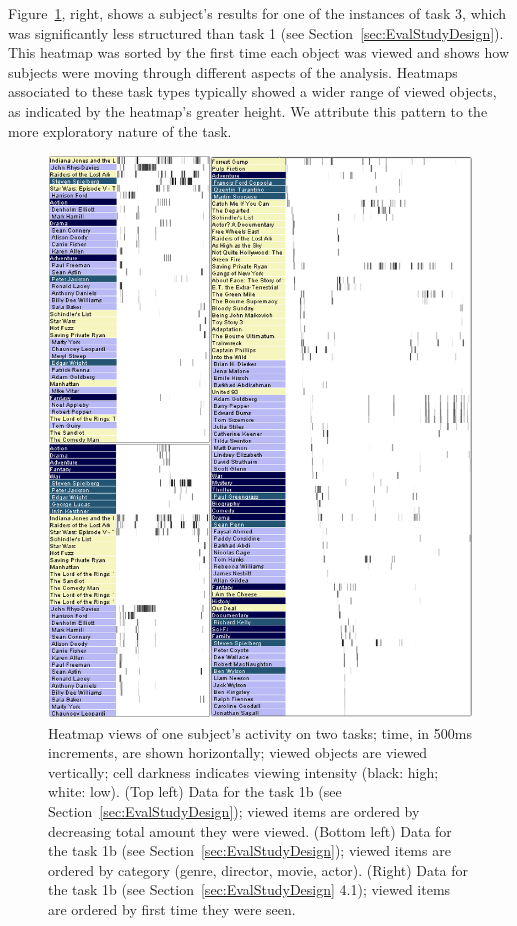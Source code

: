 Figure~\ref{fig:heatmap}, right, shows a subject's results for one of the instances of task 3, which was significantly less structured than task 1 (see Section~\ref{sec:EvalStudyDesign}). This heatmap  was sorted by the first time each object was viewed and shows how subjects were moving through different aspects of the analysis. Heatmaps associated to these task types typically showed a wider range of viewed objects, as indicated by the heatmap's greater height. We attribute this pattern to the more exploratory nature of the task.  

\begin{figure}[!ht]
  \centering
  \includegraphics[width=0.9\linewidth]{images/heatmaps.eps}
  \caption{Heatmap views of one subject's activity on two tasks; time, in 500ms increments, are shown horizontally; viewed objects are viewed vertically; cell darkness indicates viewing intensity (black: high; white: low). (Top left) Data for the task 1b (see Section~\ref{sec:EvalStudyDesign}); viewed items are ordered by decreasing total amount they were viewed. (Bottom left) Data for the task 1b (see Section~\ref{sec:EvalStudyDesign}); viewed items are ordered by category (genre, director, movie, actor). (Right) Data for the task 1b (see Section~\ref{sec:EvalStudyDesign} 4.1); viewed items are ordered by first time they were seen. 
}
	\label{fig:heatmap}
\end{figure}

